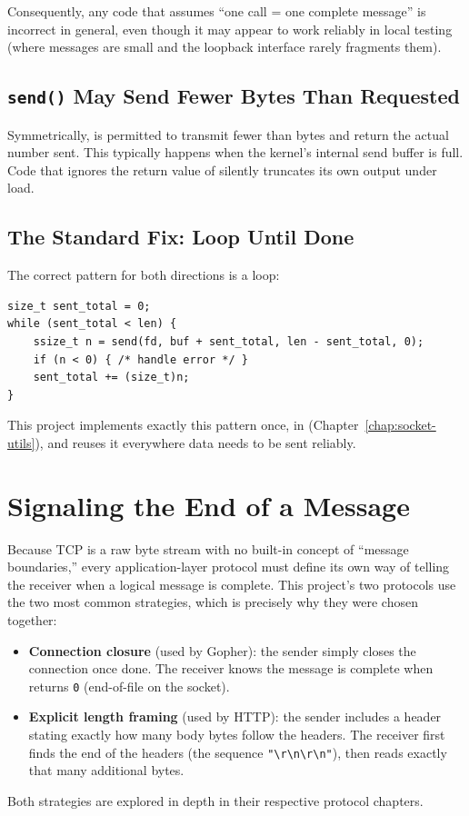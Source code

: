 Consequently, any code that assumes ``one  call = one complete message'' is incorrect in general, even though it may appear to work reliably in local testing (where messages are small and the loopback interface rarely fragments them).

\subsection{\texttt{send()} May Send Fewer Bytes Than Requested}

Symmetrically,  is permitted to transmit fewer than  bytes and return the actual number sent. This typically happens when the kernel's internal send buffer is full. Code that ignores the return value of  silently truncates its own output under load.

\subsection{The Standard Fix: Loop Until Done}

The correct pattern for both directions is a loop:

\begin{lstlisting}[style=cstyle]
size_t sent_total = 0;
while (sent_total < len) {
    ssize_t n = send(fd, buf + sent_total, len - sent_total, 0);
    if (n < 0) { /* handle error */ }
    sent_total += (size_t)n;
}
\end{lstlisting}

This project implements exactly this pattern once, in  (Chapter~\ref{chap:socket-utils}), and reuses it everywhere data needs to be sent reliably.

\section{Signaling the End of a Message}

Because TCP is a raw byte stream with no built-in concept of ``message boundaries,'' every application-layer protocol must define its own way of telling the receiver when a logical message is complete. This project's two protocols use the two most common strategies, which is precisely why they were chosen together:

\begin{itemize}
    \item \textbf{Connection closure} (used by Gopher): the sender simply closes the connection once done. The receiver knows the message is complete when  returns \texttt{0} (end-of-file on the socket).
    \item \textbf{Explicit length framing} (used by HTTP): the sender includes a  header stating exactly how many body bytes follow the headers. The receiver first finds the end of the headers (the sequence \texttt{"\textbackslash r\textbackslash n\textbackslash r\textbackslash n"}), then reads exactly that many additional bytes.
\end{itemize}

Both strategies are explored in depth in their respective protocol chapters.

